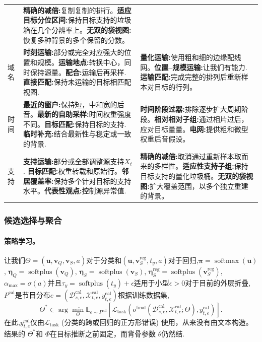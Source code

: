 \begin{longtable}{@{}>{\raggedright\arraybackslash}p{} >{\raggedright\arraybackslash}p{} >{\raggedright\arraybackslash}p{}@{}}
      & \textbf{精确的减倍:}复制复制的排行。\textbf{适应目标分位区间:}保持目标支持的垃圾箱在几个分辨率上。\textbf{无双的袋视图:}恢复多种背景的多个保留的分数。\\
域名& \textbf{时刻运输:}部分或完全对应强大的位置和规模。\textbf{运输地点:}转换中心，同时保持源量。\textbf{配合:}运输后再采样.
        \textbf{直接匹配:}保持未运输的目标相匹配视图.& \textbf{量化运输:}使用粗和细的边缘配线网。\textbf{位置--规模运输:}让我们有能力.
        \textbf{运输匹配:}完成完整的排列后重新样本对目标的行列。\\
时间& \textbf{最近的窗户:}保持短，中和宽的后音。\textbf{最新的自助采样:}时间权重强度不同。\textbf{目标匹配:}保持目标的支持.
        \textbf{临时补充:}结合最新性与稳定或一致的背景.& \textbf{时间阶段过器:}排除逐步扩大周期阶段。\textbf{相对相对子组:}通过相片过后，应对目标量量。\textbf{电网:}提供粗和微型权重后音假设。\\
支持& \textbf{支持运输:}部分或全部调整源支持$X_t$. \textbf{目标匹配:}权重转载和原始行。\textbf{邻居覆盖率:}保持多个针对目标的支持水平。\textbf{代表性观点:}控制源异常值.
      & \textbf{精确的减倍:}取消通过重新样本取而来的多样性。\textbf{适应性支持子组:}保持目标支持的量化垃圾桶。\textbf{无双的袋视图:}扩大覆盖范围，以多个独立重建的背景。\\
  \end{longtable}
\endgroup

\fi
\subsubsection{候选选择与聚合}
\label{app:regression_evidence}

\paragraph{策略学习。}
\label{app:policy_learning}让我们$\Theta=(\mathbf u,\mathbf v_Q,\mathbf v_S,a)$对于分类和$(\mathbf u,\mathbf v_S^{\mathrm{reg}},t_y,a)$对于回归,$\boldsymbol\pi=\operatorname{softmax}(\mathbf u)$,
$\boldsymbol\eta_Q=\operatorname{softplus}(\mathbf v_Q)$,
$\boldsymbol\eta_S=\operatorname{softplus}(\mathbf v_S)$,
$\boldsymbol\eta_S^{\mathrm{reg}}=
\operatorname{softplus}(\mathbf v_S^{\mathrm{reg}})$,
$\alpha_{\max}=\sigma(a)$并且$\tau_y=\operatorname{softplus}(t_y)+\epsilon$适用于小型$\epsilon>0$对于目前的外层折叠,$P^{\mathrm{cal}}$是节目分布$e=(\mathcal D_{s,e}^{\mathrm{cal}},\mathcal X_{t,e}^{\mathrm{cal}},
y_{t,e}^{\mathrm{cal}})$根据训练数据集,
\begin{equation}
  \Theta^*\in\arg\min_{\Theta}
  \mathbb E_{e\sim P^{\mathrm{cal}}}
  \!\left[\mathcal L_{\mathrm{task}}
  \!\left(o^{\mathrm{final}}(\mathcal D_{s,e}^{\mathrm{cal}},
  \mathcal X_{t,e}^{\mathrm{cal}};\Theta),y_{t,e}^{\mathrm{cal}}\right)\right].
  \label{eq:joint_calibration}
\end{equation}
在此,$y_{t,e}^{\mathrm{cal}}$仅由$\mathcal L_{\mathrm{task}}$ (分类的跨或回归的正方形错误) 使用，从来没有由文本构造。结果的 $\Theta^*$和 $\Phi$在目标推断之前固定，而背骨参数 $\theta$仍然结.

